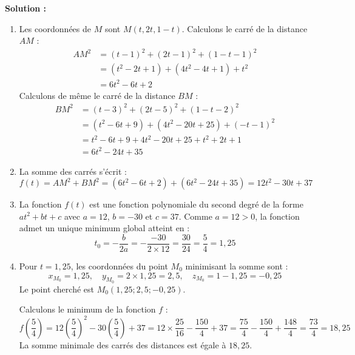 \textbf{Solution :}
\begin{enumerate}
    \item Les coordonnées de $M$ sont $M(t, 2t, 1-t)$.
    Calculons le carré de la distance $AM$ :
    \[
    \begin{aligned}
    AM^2 &= (t - 1)^2 + (2t - 1)^2 + (1 - t - 1)^2 \\
    &= (t^2 - 2t + 1) + (4t^2 - 4t + 1) + t^2 \\
    &= 6t^2 - 6t + 2
    \end{aligned}
    \]
    Calculons de même le carré de la distance $BM$ :
    \[
    \begin{aligned}
    BM^2 &= (t - 3)^2 + (2t - 5)^2 + (1 - t - 2)^2 \\
    &= (t^2 - 6t + 9) + (4t^2 - 20t + 25) + (-t-1)^2 \\
    &= t^2 - 6t + 9 + 4t^2 - 20t + 25 + t^2 + 2t + 1 \\
    &= 6t^2 - 24t + 35
    \end{aligned}
    \]
    
    \item La somme des carrés s'écrit :
    \[
    f(t) = AM^2 + BM^2 = (6t^2 - 6t + 2) + (6t^2 - 24t + 35) = 12t^2 - 30t + 37
    \]
    
    \item La fonction $f(t)$ est une fonction polynomiale du second degré de la forme $at^2 + bt + c$ avec $a = 12$, $b = -30$ et $c = 37$.
    Comme $a = 12 > 0$, la fonction admet un unique minimum global atteint en :
    \[
    t_0 = -\frac{b}{2a} = -\frac{-30}{2 \times 12} = \frac{30}{24} = \frac{5}{4} = 1,25
    \]
    
    \item Pour $t = 1,25$, les coordonnées du point $M_0$ minimisant la somme sont :
    \[
    x_{M_0} = 1,25, \quad y_{M_0} = 2 \times 1,25 = 2,5, \quad z_{M_0} = 1 - 1,25 = -0,25
    \]
    Le point cherché est $M_0(1,25; 2,5; -0,25)$.
    
    Calculons le minimum de la fonction $f$ :
    \[
    f\left(\frac{5}{4}\right) = 12\left(\frac{5}{4}\right)^2 - 30\left(\frac{5}{4}\right) + 37 = 12 \times \frac{25}{16} - \frac{150}{4} + 37 = \frac{75}{4} - \frac{150}{4} + \frac{148}{4} = \frac{73}{4} = 18,25
    \]
    La somme minimale des carrés des distances est égale à $18,25$.
\end{enumerate}

